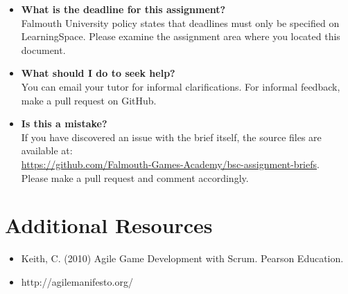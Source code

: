 \documentclass{../fal_assignment}
\begin{document}
\begin{itemize}
	\item 	\textbf{What is the deadline for this assignment?} \\ 
    		Falmouth University policy states that deadlines must only be specified on LearningSpace. Please examine the assignment area where you located this document.
    		
	\item 	\textbf{What should I do to seek help?} \\ 
    		You can email your tutor for informal clarifications. For informal feedback, make a pull request on GitHub. 
    		
    	\item 	\textbf{Is this a mistake?} \\ 	
    		If you have discovered an issue with the brief itself, the source files are available at: \\
    		\url{https://github.com/Falmouth-Games-Academy/bsc-assignment-briefs}.\\
    		 Please make a pull request and comment accordingly.
\end{itemize}

\section*{Additional Resources}

\begin{itemize}
    \item Keith, C. (2010) Agile Game Development with Scrum. Pearson Education.
    \item http://agilemanifesto.org/
\end{itemize}
\end{document}
